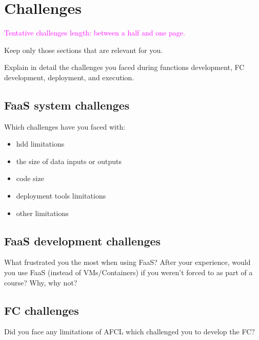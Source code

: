 \chapter{\label{chap:challenges}Challenges}

\textcolor{magenta}{Tentative challenges length: between a half and one page.}

\vspace{20 pt}

Keep only those sections that are relevant for you.

\vspace{20 pt}

Explain in detail the challenges you faced during functions development, FC development, deployment, and execution. 


%
%
%
\section{FaaS system challenges}

Which challenges have you faced with:

\begin{itemize}
    \item hdd limitations
    \item the size of data inputs or outputs
    \item code size
    \item deployment tools limitations
    \item other limitations
\end{itemize}



%
%
%
\section{FaaS development challenges}

What frustrated you the most when using FaaS?
After your experience, would you use FaaS (instead of VMs/Containers) if you weren't forced to as part of a course? Why, why not?



%
%
%
\section{FC challenges}

Did you face any limitations of AFCL which challenged you to develop the FC?
